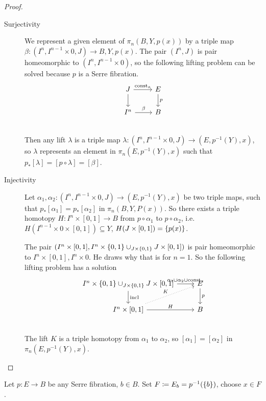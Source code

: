\documentclass[language=english]{TemplateLecture}
\begin{document}
\begin{proof}
    \begin{description}
        \item[Surjectivity] We represent a given element of \(\pi_n(B,Y, p(x))\) by a triple map \(\beta\colon (I^n, I^{n-1}\times 0, J) \to B,Y, p(x)\). The pair \((I^n, J)\) is pair homeomorphic to \((I^n, I^{n-1}\times 0)\), so the following lifting problem can be solved because \(p\) is a Serre fibration.
        \[\begin{tikzcd}
            J \ar[r, "\const_x"] \ar[d] & E \ar[d, "p"] \\
            I^n \ar[r, "\beta"] & B \\
        \end{tikzcd}\]
        Then any lift \(\lambda\) is a triple map \(\lambda\colon (I^n, I^{n-1}\times 0, J) \to (E, p^{-1}(Y), x)\), so \(\lambda\) represents an element in \(\pi_n(E, p^{-1}(Y), x)\) such that \(p_*[\lambda] = [p \circ \lambda] = [\beta]\).
        \item[Injectivity] Let \(\alpha_1, \alpha_2\colon (I^n, I^{n-1}\times 0, J) \to (E, p^{-1}(Y), x)\) be two triple maps, such that \(p_*[\alpha_1] = p_*[\alpha_2]\) in \(\pi_n(B, Y, P(x))\). So there exists a triple homotopy \(H \colon I^n \times [0,1] \to B\) from \(p \circ \alpha_1\) to \(p \circ \alpha_2\), i.e. \(H(I^{n-1}\times 0 \times [0,1]) \subseteq Y\), \(H(J \times [0,1]) = \{p(x)\}\).
        
        The pair \((I^n \times [0,1], I^n \times \{0,1\} \cup_{J \times \{0,1\}} J \times [0,1])\) is pair homeomorphic to \(I^n \times [0,1], I^n \times 0\). He draws why that is for \(n = 1\). So the following lifting problem has a solution
        \[\begin{tikzcd}
            I^n \times \set{0,1} \cup_{J \times \set{0,1}} J \times [0,1] \ar[r, "\alpha_1 \cup \alpha_2 \cup \const_x"] \ar[d, "\incl"] & E \ar[d, "p"] \\
            I^n \times [0,1] \ar[r, "H"] \ar[ru, dotted, "K"] & B \\
        \end{tikzcd}\]
        The lift \(K\) is a triple homotopy from \(\alpha_1\) to \(\alpha_2\), so \([\alpha_1] = [\alpha_2]\) in \(\pi_n(E, p^{-1}(Y), x)\).
    \end{description}
\end{proof}

Let \(p \colon E \to B\) be any Serre fibration, \(b \in B\). Set \(F \coloneq E_b = p^{-1}(\{b\})\), choose \(x \in F\).
\end{document}
